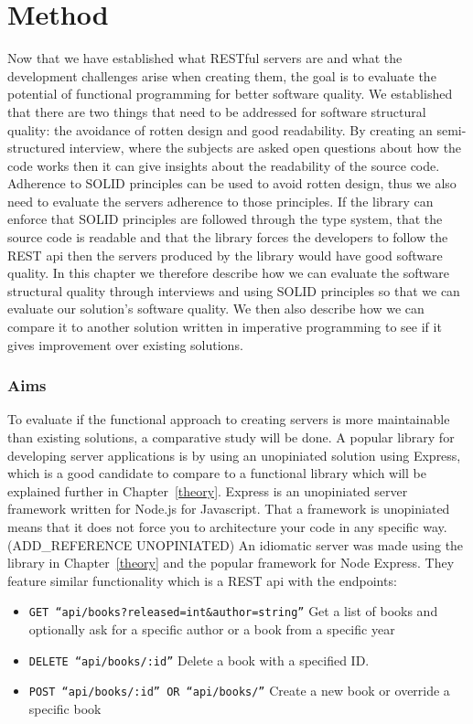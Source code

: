 \chapter{Method}\label{method}

Now that we have established what RESTful servers are and what the development
challenges arise when creating them, the goal is to evaluate the potential of
functional programming for better software quality. We established that there
are two things that need to be addressed for software structural quality: the
avoidance of rotten design and good readability. By creating an semi-structured
interview, where the subjects are asked open questions about how the code works
then it can give insights about the readability of the source code. Adherence to
SOLID principles can be used to avoid rotten design, thus we also need to
evaluate the servers adherence to those principles. If the library can enforce
that SOLID principles are followed through the type system, that the source code
is readable and that the library forces the developers to follow the REST api
then the servers produced by the library would have good software quality. In
this chapter we therefore describe how we can evaluate the software structural
quality through interviews and using SOLID principles so that we can evaluate
our solution's software quality. We then also describe how we can compare it to
another solution written in imperative programming to see if it gives
improvement over existing solutions.

\subsection{Aims}

To evaluate if the functional approach to creating servers is more maintainable
than existing solutions, a comparative study will be done.  A popular library
for developing server applications is by using an unopiniated solution using
Express, which is a good candidate to compare to a functional library which will
be explained further in Chapter~\ref{theory}.  Express is an unopiniated server
framework written for Node.js for Javascript.  That a framework is unopiniated
means that it does not force you to architecture your code in any specific
way.(ADD\_REFERENCE UNOPINIATED) An idiomatic server was made using the library
in Chapter~\ref{theory} and the popular framework for Node Express. They feature
similar functionality which is a REST api with the endpoints:

\begin{itemize}
    \item \texttt{GET ``api/books?released=int\&author=string''} Get a list of
    books and optionally ask for a specific author or a book from a specific
    year
    \item \texttt{DELETE ``api/books/:id''} Delete a book with a specified ID.
    \item \texttt{POST ``api/books/:id'' OR ``api/books/''} Create a new book or
    override a specific book
\end{itemize}

